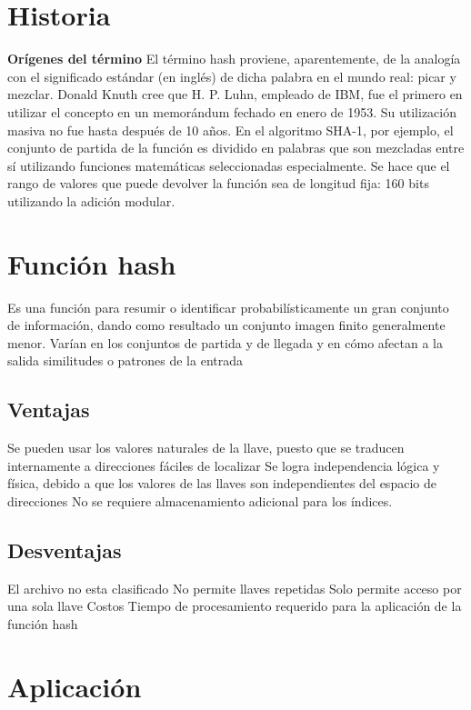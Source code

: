 \documentclass[letterpaper,openright,12pt]{report}
\begin{document}
\section{Historia}

\textbf{Orígenes del término} El término hash proviene, aparentemente,
de la analogía con el significado estándar (en inglés) de dicha palabra
en el mundo real: picar y mezclar. Donald Knuth cree que H. P. Luhn,
empleado de IBM, fue el primero en utilizar el concepto en un memorándum
fechado en enero de 1953. Su utilización masiva no fue hasta después de
10 años. En el algoritmo SHA-1, por ejemplo, el conjunto de partida de
la función es dividido en palabras que son mezcladas entre sí utilizando
funciones matemáticas seleccionadas especialmente. Se hace que el rango
de valores que puede devolver la función sea de longitud fija: 160 bits
utilizando la adición modular.
\newpage
\section{Función hash}

Es una función para resumir o identificar probabilísticamente un gran
conjunto de información, dando como resultado un conjunto imagen finito
generalmente menor. Varían en los conjuntos de partida y de llegada y en
cómo afectan a la salida similitudes o patrones de la entrada

\subsection{Ventajas}

Se pueden usar los valores naturales de la llave, puesto que se traducen
internamente a direcciones fáciles de localizar Se logra independencia
lógica y física, debido a que los valores de las llaves son
independientes del espacio de direcciones No se requiere almacenamiento
adicional para los índices.

\subsection{Desventajas}

El archivo no esta clasificado No permite llaves repetidas Solo permite
acceso por una sola llave Costos Tiempo de procesamiento requerido para
la aplicación de la función hash
\newpage

\section{Aplicación}
\end{document}
